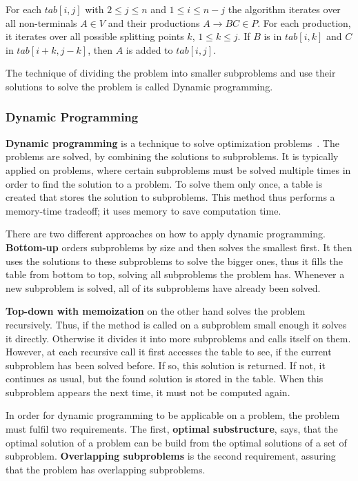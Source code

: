 For each $tab[i,j]$ with $2\leq j \leq n$ and $1\leq i \le n-j$ the algorithm iterates over all non-terminals $A\in V$ and their productions $A\rightarrow BC \in P$.
For each production, it iterates over all possible splitting points $k$, $1\leq k\le j$.
If $B$ is in $tab[i, k]$ and $C$ in $tab[i+k,j-k]$, then $A$ is added to $tab[i,j]$.

The technique of dividing the problem into smaller subproblems and use their solutions to solve the problem is called Dynamic programming.

\subsubsection{Dynamic Programming}
\label{sec:dynamic_programming}
\textbf{Dynamic programming} is a technique to solve optimization problems~\cite{cormen2009introduction}.
The problems are solved, by combining the solutions to subproblems.
It is typically applied on problems, where certain subproblems must be solved multiple times in order to find the solution to a problem.
To solve them only once, a table is created that stores the solution to subproblems.
This method thus performs a memory-time tradeoff; it uses memory to save computation time.

There are two different approaches on how to apply dynamic programming.
\textbf{Bottom-up} orders subproblems by size and then solves the smallest first.
It then uses the solutions to these subproblems to solve the bigger ones, thus it fills the table from bottom to top, solving all subproblems the problem has.
Whenever a new subproblem is solved, all of its subproblems have already been solved.

\textbf{Top-down with memoization} on the other hand solves the problem recursively.
Thus, if the method is called on a subproblem small enough it solves it directly.
Otherwise it divides it into more subproblems and calls itself on them.
However, at each recursive call it first accesses the table to see, if the current subproblem has been solved before.
If so, this solution is returned.
If not, it continues as usual, but the found solution is stored in the table.
When this subproblem appears the next time, it must not be computed again.

In order for dynamic programming to be applicable on a problem, the problem must fulfil two requirements.
The first, \textbf{optimal substructure}, says, that the optimal solution of a problem can be build from the optimal solutions of a set of subproblem.
\textbf{Overlapping subproblems} is the second requirement, assuring that the problem has overlapping subproblems.

